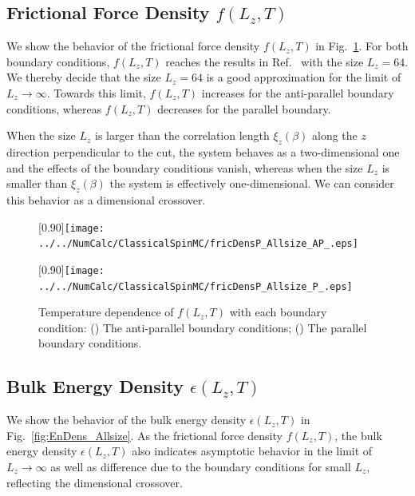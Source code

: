 \subsection{Frictional Force Density $f(L_{z}, T)$}

We show the behavior of the frictional force density $f(L_{z}, T)$ in Fig.~\ref{fig:fricDens_Allsize}. For both boundary conditions, $f(L_{z}, T)$ reaches the results in Ref.~\cite{Kadau2008} with the size $L_{z}=64$. We thereby decide that the size $L_{z}=64$ is a good approximation for the limit of $L_{z}\to\infty$. Towards this limit, $f(L_{z}, T)$ increases for the anti-parallel boundary conditions, whereas $f(L_{z}, T)$ decreases for the parallel boundary. 

When the size $L_{z}$ is larger than the correlation length $\xi_{z}(\beta)$ along the $z$ direction perpendicular to the cut, the system behaves as a two-dimensional one and the effects of the boundary conditions vanish, whereas when the size $L_{z}$ is smaller than $\xi_{z}(\beta)$ the system is effectively one-dimensional. We can consider this behavior as a dimensional crossover. 

\begin{figure}[htbp]
	\centering
	\subcaptionbox{\label{fig:fricDens_Allsize_AP}}[0.90\linewidth]{\texttt{[image: ../../NumCalc/ClassicalSpinMC/fricDensP\_Allsize\_AP\_.eps]}}
	
	\subcaptionbox{\label{fig:fricDens_Allsize_P}}[0.90\linewidth]{\texttt{[image: ../../NumCalc/ClassicalSpinMC/fricDensP\_Allsize\_P\_.eps]}}
	
	\caption{Temperature dependence of $f(L_{z}, T)$ with each boundary condition: () The anti-parallel boundary conditions; () The parallel boundary conditions.}
	\label{fig:fricDens_Allsize}
\end{figure}



\subsection{Bulk Energy Density $\epsilon(L_{z}, T)$}

We show the behavior of the bulk energy density $\epsilon(L_{z}, T)$ in Fig.~\ref{fig:EnDens_Allsize}. As the frictional force density $f(L_{z}, T)$, the bulk energy density $\epsilon(L_{z}, T)$ also indicates asymptotic behavior in the limit of $L_{z}\to\infty$ as well as difference due to the boundary conditions for small $L_{z}$, reflecting the dimensional crossover.

